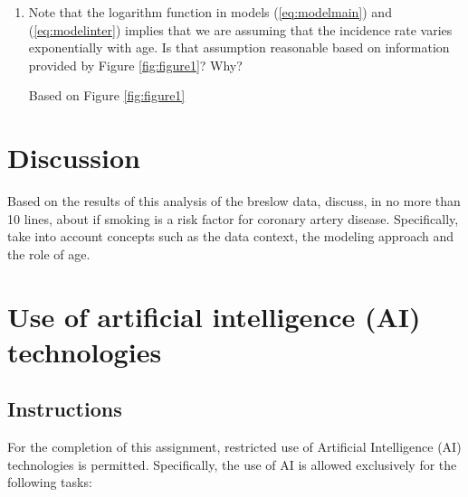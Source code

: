 \documentclass[10pt,a4paper,twoside]{article}\usepackage[]{graphicx}\usepackage[]{xcolor}
\begin{document}
\begin{enumerate}
    \item  Note that the logarithm function in models (\ref{eq:modelmain}) and (\ref{eq:modelinter}) implies that we are assuming that the incidence rate varies exponentially with age. Is that assumption reasonable based on information provided by Figure \ref{fig:figure1}? Why?

    Based on Figure \ref{fig:figure1} 



\end{enumerate}


\section{Discussion}
\label{sec:Discussion}

Based on the results of this analysis of the breslow data, discuss, in no more than 10 lines, about if smoking is a risk factor for coronary artery disease. Specifically, take into account concepts such as the data context, the modeling approach and the role of age.

\section{Use of artificial intelligence (AI) technologies}
\label{sec:AIuse}
\subsection{Instructions}
\label{sec:Instructions}
For the completion of this assignment, restricted use of Artificial Intelligence (AI) technologies is permitted. Specifically, the use of AI is allowed exclusively for the following tasks:
\end{document}
